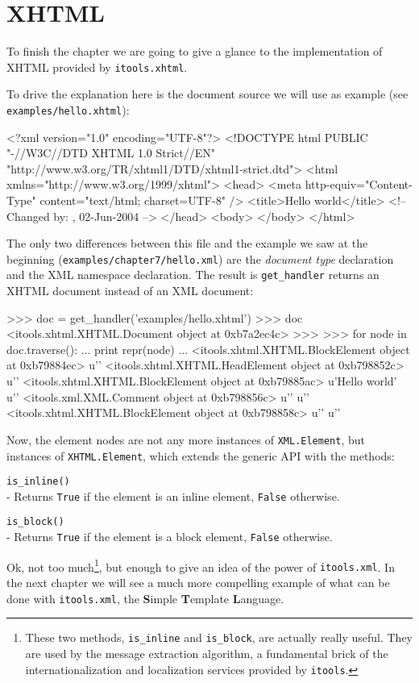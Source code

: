 \section{XHTML}

To finish the chapter we are going to give a glance to the implementation
of XHTML provided by {\tt itools.xhtml}.

To drive the explanation here is the document source we will use as example
(see {\tt examples/hello.xhtml}):

\begin{code}
    <?xml version="1.0" encoding="UTF-8"?>
    <!DOCTYPE html PUBLIC "-//W3C//DTD XHTML 1.0 Strict//EN"
           "http://www.w3.org/TR/xhtml1/DTD/xhtml1-strict.dtd">
    <html xmlns="http://www.w3.org/1999/xhtml">
      <head>
        <meta http-equiv="Content-Type" content="text/html; charset=UTF-8" />
        <title>Hello world</title>
        <!-- Changed by: , 02-Jun-2004 -->
      </head>
      <body>
      </body>
    </html>
\end{code}

The only two differences between this file and the example we saw at the
beginning ({\tt examples/chapter7/hello.xml}) are the {\em document type}
declaration and the XML namespace declaration. The result is {\tt get\_handler}
returns an XHTML document instead of an XML document:

\begin{code}
    >>> doc = get_handler('examples/hello.xhtml')
    >>> doc
    <itools.xhtml.XHTML.Document object at 0xb7a2ec4c>
    >>> 
    >>> for node in doc.traverse():
    ...     print repr(node)
    ... 
    <itools.xhtml.XHTML.BlockElement object at 0xb79884ec>
    u'\n  '
    <itools.xhtml.XHTML.HeadElement object at 0xb798852c>
    u'\n    \n    '
    <itools.xhtml.XHTML.BlockElement object at 0xb79885ac>
    u'Hello world'
    u'\n    '
    <itools.xml.XML.Comment object at 0xb798856c>
    u'\n  '
    u'\n  '
    <itools.xhtml.XHTML.BlockElement object at 0xb798858c>
    u'\n  '
    u'\n'
\end{code}

Now, the element nodes are not any more instances of {\tt XML.Element}, but
instances of {\tt XHTML.Element}, which extends the generic API with the
methods:

\begin{api}
    {\tt is\_inline()}\\
    - Returns {\tt True} if the element is an inline element, {\tt False}
    otherwise.

    {\tt is\_block()}\\
    - Returns {\tt True} if the element is a block element, {\tt False}
    otherwise.
\end{api}

Ok, not too much\footnote{These two methods, {\tt is\_inline} and
{\tt is\_block}, are actually really useful. They are used by the message
extraction algorithm, a fundamental brick of the internationalization and
localization services provided by {\tt itools}.}, but enough to give an
idea of the power of {\tt itools.xml}. In the next chapter we will see a
much more compelling example of what can be done with {\tt itools.xml},
the {\bf S}imple {\bf T}emplate {\bf L}anguage.


